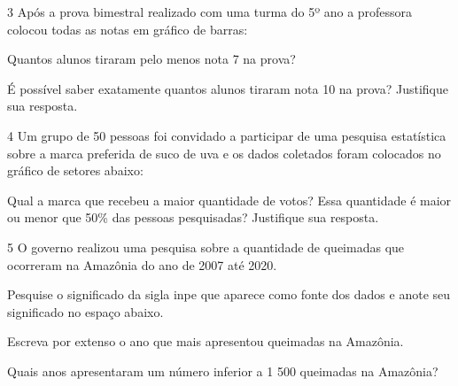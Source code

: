 \num{3} Após a prova bimestral realizado com uma turma do 5º ano a
professora colocou todas as notas em gráfico de barras:


\begin{escolha}
\item
  Quantos alunos tiraram pelo menos nota 7 na prova?


\item
  É possível saber exatamente quantos alunos tiraram nota 10 na prova?
  Justifique sua resposta.

\end{escolha}


\num{4} Um grupo de 50 pessoas foi convidado a participar de uma pesquisa
estatística sobre a marca preferida de suco de uva e os dados coletados
foram colocados no gráfico de setores abaixo:


Qual a marca que recebeu a maior quantidade de votos? Essa quantidade é
maior ou menor que 50\% das pessoas pesquisadas? Justifique sua
resposta.



\num{5} O governo realizou uma pesquisa sobre a quantidade de queimadas que
ocorreram na Amazônia do ano de 2007 até 2020.


\begin{escolha}
\item
  Pesquise o significado da sigla inpe que aparece como fonte dos dados
  e anote seu significado no espaço abaixo.


\item
  Escreva por extenso o ano que mais apresentou queimadas na Amazônia.


\item
  Quais anos apresentaram um número inferior a 1 500 queimadas na
  Amazônia?

\end{escolha}


